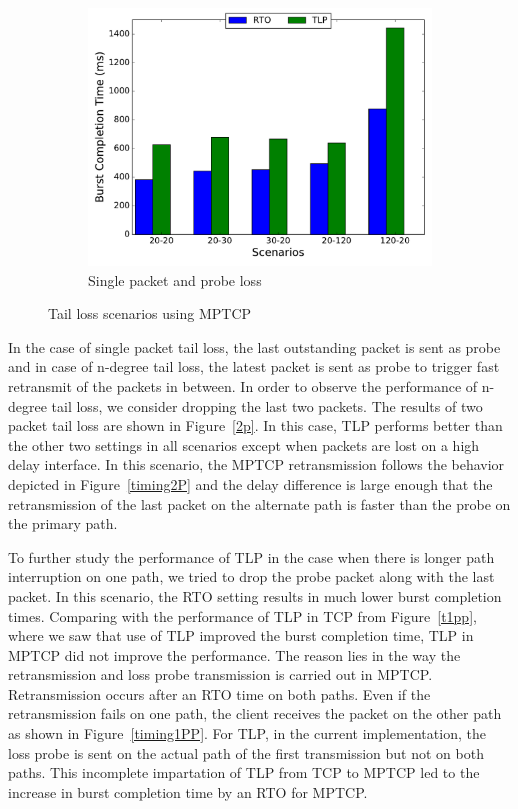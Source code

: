 \documentclass[10pt,conference]{IEEEtran}
\begin{document}
\begin{figure}[!tbp]
\begin{subfigure}[b]{0.32\textwidth}
\includegraphics[angle=0, width=\textwidth, natwidth=578.16,natheight=433.62]{plots/1PP.pdf}
\caption{Single packet and probe loss}\label{1pp}
 \end{subfigure}
 \caption{Tail loss scenarios using MPTCP}
\end{figure}




In the case of single packet tail loss, the last outstanding packet is sent as probe and in case of n-degree tail loss, the latest packet is sent 
as probe to trigger fast retransmit of the packets in between. In order to observe the performance of n-degree tail loss, we consider dropping the 
last two packets. The results of two packet tail loss are shown in Figure~\ref{2p}. In this case, TLP performs better than the other 
two settings in all scenarios except when packets are lost on a high delay interface. In this scenario, the MPTCP retransmission follows the 
behavior depicted in Figure~\ref{timing2P} and the delay difference is large enough that the retransmission of the last packet on the alternate 
path is faster than the probe on the primary path. 


To further study the performance of TLP in the case when there is longer path interruption on one path, we tried to drop the probe packet along 
with the last packet. In this scenario, the RTO setting results in much lower burst completion times. Comparing with the performance of TLP in 
TCP from Figure~\ref{t1pp}, where we saw that use of TLP improved the burst completion time, TLP in MPTCP did not improve the performance. The 
reason lies in the way the retransmission and loss probe transmission is carried out in MPTCP. Retransmission occurs after an RTO time on both 
paths. Even if the retransmission fails on one path, the client receives the packet on the other path as shown in Figure~\ref{timing1PP}. For TLP, 
in the current implementation, the loss probe is sent on the actual path of the first transmission but not on both paths. This incomplete impartation 
of TLP from TCP to MPTCP led to the increase in burst completion time by an RTO for MPTCP. 
\end{document}
